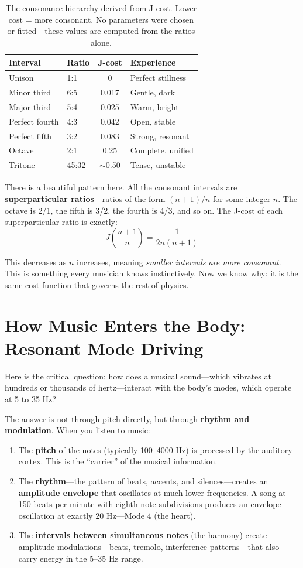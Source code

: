 \documentclass[11pt,a4paper]{article}
\begin{document}
\begin{table}[h]
\centering
\begin{tabular}{llcl}
\toprule
\textbf{Interval} & \textbf{Ratio} & \textbf{J-cost} & \textbf{Experience} \\
\midrule
Unison & 1:1 & 0 & Perfect stillness \\
Minor third & 6:5 & 0.017 & Gentle, dark \\
Major third & 5:4 & 0.025 & Warm, bright \\
Perfect fourth & 4:3 & 0.042 & Open, stable \\
Perfect fifth & 3:2 & 0.083 & Strong, resonant \\
Octave & 2:1 & 0.25 & Complete, unified \\
Tritone & 45:32 & $\sim$0.50 & Tense, unstable \\
\bottomrule
\end{tabular}
\caption{The consonance hierarchy derived from J-cost. Lower cost = more consonant. No parameters were chosen or fitted---these values are computed from the ratios alone.}
\end{table}

There is a beautiful pattern here. All the consonant intervals are \textbf{superparticular ratios}---ratios of the form $(n+1)/n$ for some integer $n$. The octave is 2/1, the fifth is 3/2, the fourth is 4/3, and so on. The J-cost of each superparticular ratio is exactly:
\[
J\!\left(\frac{n+1}{n}\right) = \frac{1}{2n(n+1)}
\]

This decreases as $n$ increases, meaning \emph{smaller intervals are more consonant}. This is something every musician knows instinctively. Now we know why: it is the same cost function that governs the rest of physics.

\section{How Music Enters the Body: Resonant Mode Driving}

Here is the critical question: how does a musical sound---which vibrates at hundreds or thousands of hertz---interact with the body's modes, which operate at 5 to 35 Hz?

The answer is not through pitch directly, but through \textbf{rhythm and modulation}. When you listen to music:

\begin{enumerate}
    \item The \textbf{pitch} of the notes (typically 100--4000 Hz) is processed by the auditory cortex. This is the ``carrier'' of the musical information.
    \item The \textbf{rhythm}---the pattern of beats, accents, and silences---creates an \textbf{amplitude envelope} that oscillates at much lower frequencies. A song at 150 beats per minute with eighth-note subdivisions produces an envelope oscillation at exactly 20 Hz---Mode 4 (the heart).
    \item The \textbf{intervals between simultaneous notes} (the harmony) create amplitude modulations---beats, tremolo, interference patterns---that also carry energy in the 5--35 Hz range.
\end{enumerate}
\end{document}
